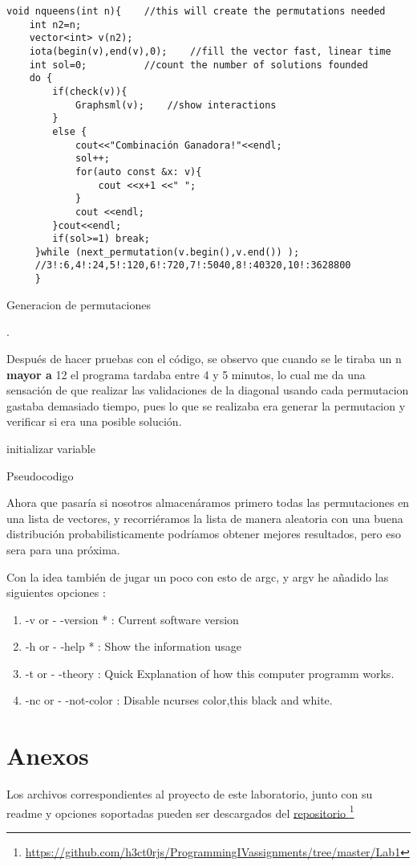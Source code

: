 \documentclass[paper=a4, fontsize=12pt]{article} 		%
\newcommand\fnurl[2]{%
\href{#2}{#1}\footnote{\url{#2}}%
}
\numberwithin{equation}{section}						%
\numberwithin{table}{section} 							%
\begin{document}
\begin{listing}[H]
	\begin{verbatim}  
void nqueens(int n){	//this will create the permutations needed
	int n2=n;
	vector<int> v(n2);
	iota(begin(v),end(v),0); 	//fill the vector fast, linear time
	int sol=0;			//count the number of solutions founded
	do {				
 		if(check(v)){
        	Graphsml(v);	//show interactions
        } 
		else {
			cout<<"Combinación Ganadora!"<<endl;
			sol++;
			for(auto const &x: v){
	    		cout <<x+1 <<" ";
	    	}
	    	cout <<endl;
		}cout<<endl;
		if(sol>=1) break;
 	 }while (next_permutation(v.begin(),v.end()) );		
     //3!:6,4!:24,5!:120,6!:720,7!:5040,8!:40320,10!:3628800
     }
\end{verbatim}
\caption{Generacion de permutaciones}.
    \label{third:nqueens}
\end{listing}
Después de hacer pruebas con el código, se observo que cuando se le tiraba un n \textbf{mayor a} 12 el programa tardaba entre 4 y 5 minutos, lo cual me da una sensación de que realizar las validaciones de la diagonal usando cada permutacion gastaba demasiado tiempo, pues lo que se realizaba era generar la permutacion y verificar si era una posible solución. 
\newline
\begin{algorithm}[H]
 initializar variable\;
 \caption{Pseudocodigo}
\end{algorithm}

Ahora que pasaría si nosotros almacenáramos primero todas las permutaciones en una lista de vectores, y recorriéramos la lista de manera aleatoria con una buena distribución 
probabilisticamente podríamos obtener mejores resultados, pero eso sera para una próxima. 

Con la idea también de jugar un poco con esto de argc, y argv he añadido las siguientes opciones :
\begin{enumerate}
\item -v or - -version * : Current software version
\item -h or - -help * : Show the information usage
\item -t or - -theory : Quick Explanation of how this computer programm works.
\item -nc or - -not-color : Disable ncurses color,this black and white.
\end{enumerate}


\section{Anexos}
Los archivos correspondientes al proyecto de este laboratorio, junto con su readme y opciones soportadas pueden ser descargados del \fnurl{repositorio }{https://github.com/h3ct0rjs/ProgrammingIVassignments/tree/master/Lab1}
\end{document}
